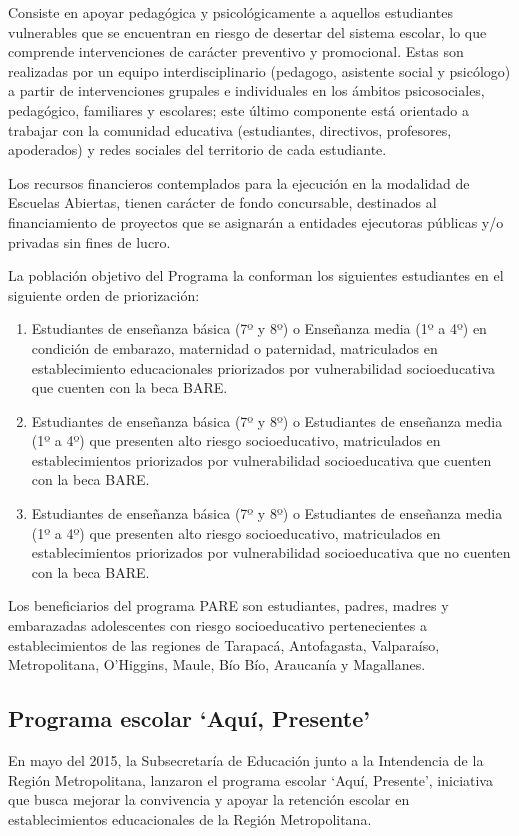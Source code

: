 Consiste en apoyar pedagógica y psicológicamente a aquellos estudiantes vulnerables que se encuentran en riesgo de desertar del sistema escolar, lo que comprende intervenciones de carácter preventivo y promocional. Estas son realizadas por un equipo interdisciplinario (pedagogo, asistente social y psicólogo) a partir de intervenciones grupales e individuales en los ámbitos psicosociales, pedagógico, familiares y escolares; este último componente está orientado a trabajar con la comunidad educativa (estudiantes, directivos, profesores, apoderados) y redes sociales del territorio de cada estudiante.

Los recursos financieros contemplados para la ejecución en la modalidad de Escuelas Abiertas, tienen carácter de fondo concursable, destinados al financiamiento de proyectos que se asignarán a entidades ejecutoras públicas y/o privadas sin fines de lucro.

La población objetivo del Programa la conforman los siguientes estudiantes en el siguiente orden de priorización:
\begin{enumerate}
\item Estudiantes de enseñanza básica (7º y 8º) o Enseñanza media (1º a 4º) en condición de embarazo, maternidad o paternidad, matriculados en establecimiento educacionales priorizados por vulnerabilidad socioeducativa que cuenten con la beca BARE.
\item Estudiantes de enseñanza básica (7º y 8º) o Estudiantes de enseñanza media (1º a 4º) que presenten alto riesgo socioeducativo, matriculados en establecimientos priorizados por vulnerabilidad socioeducativa que cuenten con la beca BARE.
\item Estudiantes de enseñanza básica (7º y 8º) o Estudiantes de enseñanza media (1º a 4º) que presenten alto riesgo socioeducativo, matriculados en establecimientos priorizados por vulnerabilidad socioeducativa que no cuenten con la beca BARE.
\end{enumerate}

Los beneficiarios del programa PARE son estudiantes, padres, madres y embarazadas adolescentes con riesgo socioeducativo pertenecientes a establecimientos de las regiones de Tarapacá, Antofagasta, Valparaíso, Metropolitana, O'Higgins, Maule, Bío Bío, Araucanía y Magallanes. \cite{pare}

\subsection{Programa escolar `Aquí, Presente'}
En mayo del 2015, la Subsecretaría de Educación junto a la Intendencia de la Región Metropolitana, lanzaron el programa escolar `Aquí, Presente', iniciativa que busca mejorar la convivencia y apoyar la retención escolar en establecimientos educacionales de la Región Metropolitana.

